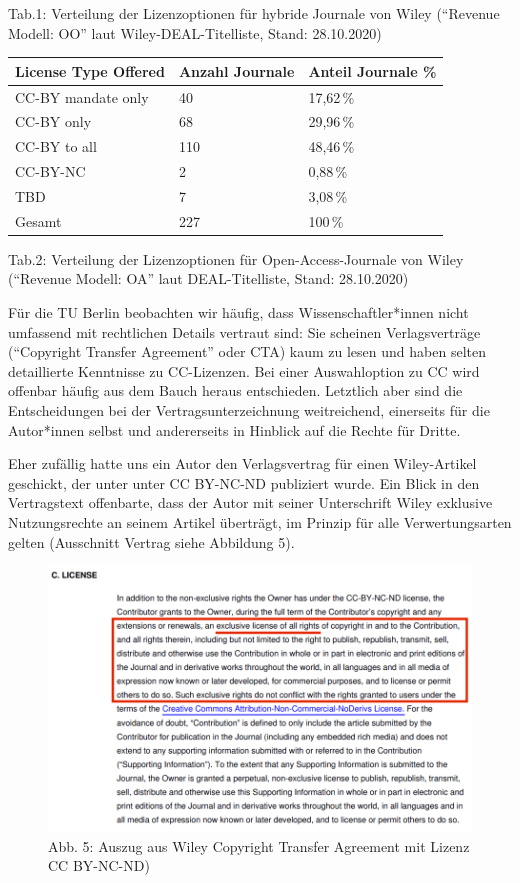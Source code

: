 \documentclass[a4paper,
fontsize=11pt,
oneside,
numbers=noperiodatend,
parskip=half-,
bibliography=totoc,
final
]{scrartcl}
\begin{document}
Tab.1: Verteilung der Lizenzoptionen für hybride Journale von Wiley
(\enquote{Revenue Modell: OO} laut Wiley-DEAL-Titelliste, Stand:
28.10.2020)

\begin{longtable}[]{@{}lll@{}}
\toprule
License Type Offered & Anzahl Journale & Anteil Journale
\%\tabularnewline
\midrule
\endhead
CC-BY mandate only & 40 & 17,62\,\%\tabularnewline
CC-BY only & 68 & 29,96\,\%\tabularnewline
CC-BY to all & 110 & 48,46\,\%\tabularnewline
CC-BY-NC & 2 & 0,88\,\%\tabularnewline
TBD & 7 & 3,08\,\%\tabularnewline
Gesamt & 227 & 100\,\%\tabularnewline
\bottomrule
\end{longtable}

Tab.2: Verteilung der Lizenzoptionen für Open-Access-Journale von Wiley
(\enquote{Revenue Modell: OA} laut DEAL-Titelliste, Stand: 28.10.2020)

Für die TU Berlin beobachten wir häufig, dass Wissenschaftler*innen
nicht umfassend mit rechtlichen Details vertraut sind: Sie scheinen
Verlagsverträge (\enquote{Copyright Transfer Agreement} oder CTA) kaum
zu lesen und haben selten detaillierte Kenntnisse zu CC-Lizenzen. Bei
einer Auswahloption zu CC wird offenbar häufig aus dem Bauch heraus
entschieden. Letztlich aber sind die Entscheidungen bei der
Vertragsunterzeichnung weitreichend, einerseits für die Autor*innen
selbst und andererseits in Hinblick auf die Rechte für Dritte.

Eher zufällig hatte uns ein Autor den Verlagsvertrag für einen
Wiley-Artikel geschickt, der unter unter CC BY-NC-ND publiziert wurde.
Ein Blick in den Vertragstext offenbarte, dass der Autor mit seiner
Unterschrift Wiley exklusive Nutzungsrechte an seinem Artikel überträgt,
im Prinzip für alle Verwertungsarten gelten (Ausschnitt Vertrag siehe
Abbildung 5).

\begin{figure}
\centering
\includegraphics{img/CTAwiley.png}
\caption{Abb. 5: Auszug aus Wiley Copyright Transfer Agreement mit
Lizenz CC BY-NC-ND)}
\end{figure}
\end{document}
